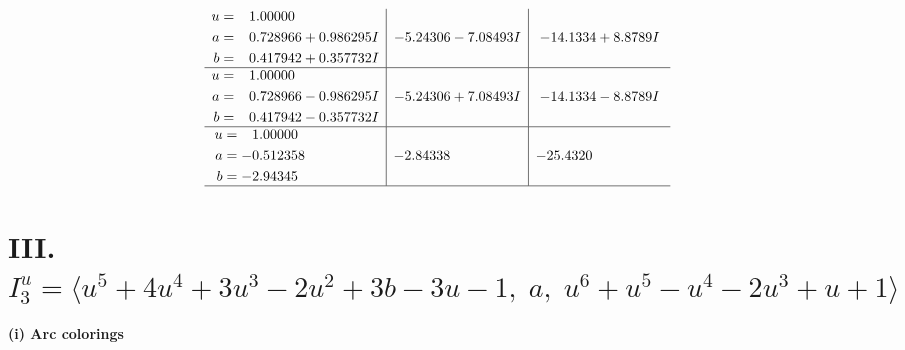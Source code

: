 \documentclass[1p]{elsarticle_modified}
\theoremstyle{definition}
\begin{document}
$$\begin{array}{c|c|c}
\begin{aligned}
u &= \phantom{-}1.00000\phantom{ +0.000000I} \\
a &= \phantom{-}0.728966 + 0.986295 I \\
b &= \phantom{-}0.417942 + 0.357732 I\end{aligned}
 & -5.24306 - 7.08493 I & -14.1334 + 8.8789 I \\ \hline\begin{aligned}
u &= \phantom{-}1.00000\phantom{ +0.000000I} \\
a &= \phantom{-}0.728966 - 0.986295 I \\
b &= \phantom{-}0.417942 - 0.357732 I\end{aligned}
 & -5.24306 + 7.08493 I & -14.1334 - 8.8789 I \\ \hline\begin{aligned}
u &= \phantom{-}1.00000\phantom{ +0.000000I} \\
a &= -0.512358\phantom{ +0.000000I} \\
b &= -2.94345\phantom{ +0.000000I}\end{aligned}
 & -2.84338\phantom{ +0.000000I} & -25.4320\phantom{ +0.000000I}\\
 \hline 
 \end{array}$$\newpage\newpage\renewcommand{\arraystretch}{1}
\centering \section*{III. $I^u_{3}= \langle u^5+4 u^4+3 u^3-2 u^2+3 b-3 u-1,\;a,\;u^6+u^5- u^4-2 u^3+u+1 \rangle$}
\flushleft \textbf{(i) Arc colorings}\\
\end{document}
